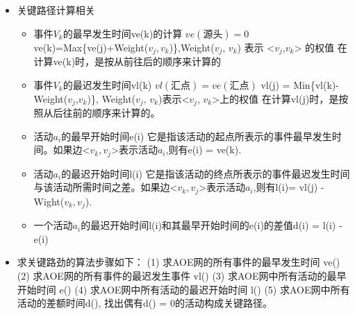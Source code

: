 \begin{itemize}[noitemsep,topsep=0pt,parsep=0pt,partopsep=0pt]
	\item 关键路径计算相关
	\begin{itemize}[noitemsep,topsep=0pt,parsep=0pt,partopsep=0pt]
	\item 事件$V_{k}$的最早发生时间ve(k)的计算\newline
		$ve(\mbox{源头}) = 0$\newline
		ve(k)=Max\{ve(j)+Weight($v_{j}, v_{k}$)\},Weight($v_{j}$, $v_{k}$) 表示 <$v_j$,$v_k$> 的权值\newline
		{\color{red}在计算ve(k)时，是按从前往后的顺序来计算的}\newline
	\item 事件$V_{k}$的最迟发生时间vl(k)\newline
		$vl(\mbox{汇点})=ve(\mbox{汇点})$\newline
		vl(j) = Min\{vl(k)-Weight($v_j$,$v_k$)\}, Weight($v_j$, $v_k$)表示<$v_j$, $v_k$>上的权值\newline
		{\color{red}在计算vl(j)时，是按照从后往前的顺序来计算的。}\newline
	\item 活动$a_i$的最早开始时间e(i)\newline
	它是指该活动的{\color{red}起点}所表示的事件最早发生时间。如果边<$v_k,v_j$>表示活动$a_i$,则有e(i) = ve(k).\newline
	\item 活动$a_i$的最迟开始时间l(i)\newline
	它是指该活动的{\color{red}终点}所表示的事件最迟发生时间与该活动所需时间之差。如果边<$v_k,v_j$>表示活动$a_i$,则有l(i)= vl(j) - Wight($v_k, v_j$).\newline
	\item 一个活动$a_i$的最迟开始时间l(i)和其最早开始时间的e(i)的差值d(i) = l(i) - e(i) 
	\end{itemize}
	\item 求关键路劲的算法步骤如下：\newline
	(1) 求AOE网的所有事件的最早发生时间 ve() \newline
	(2) 求AOE网的所有事件的最迟发生事件 vl() \newline
	(3) 求AOE网中所有活动的最早开始时间 e() \newline
	(4) 求AOE网中所有活动的最迟开始时间 l() \newline
	(5) 求AOE网中所有活动的差额时间d(), 找出偶有d() = 0的活动构成关键路径。
\end{itemize}

